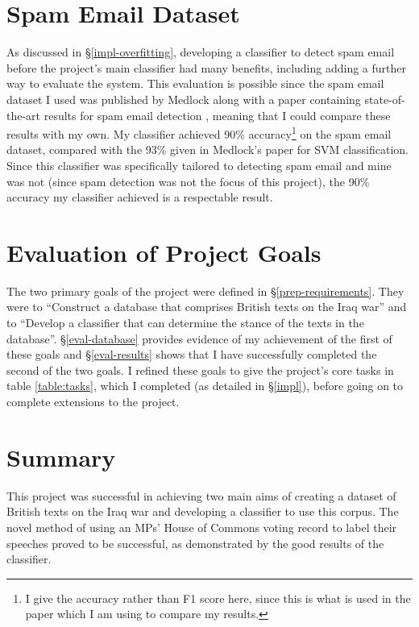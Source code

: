 \documentclass[12pt,a4paper,twoside,openright]{report}
\begin{document}
\section{Spam Email Dataset} \label{eval-spam}

As discussed in \S\ref{impl-overfitting}, developing a classifier to detect spam email before the project's main classifier had many benefits, including adding a further way to evaluate the system. This evaluation is possible since the spam email dataset I used was published by Medlock along with a paper containing state-of-the-art results for spam email detection \cite{spampaper}, meaning that I could compare these results with my own. My classifier achieved 90\% accuracy\footnote{I give the accuracy rather than F1 score here, since this is what is used in the paper which I am using to compare my results.} on the spam email dataset, compared with the 93\% given in Medlock's paper for SVM classification. Since this classifier was specifically tailored to detecting spam email and mine was not (since spam detection was not the focus of this project), the 90\% accuracy my classifier achieved is a respectable result.

\section{Evaluation of Project Goals} \label{eval-goals}

The two primary goals of the project were defined in \S\ref{prep-requirements}. They were to ``Construct a database that comprises British texts on the Iraq war'' and to ``Develop a classifier that can determine the stance of the texts in the database''. \S\ref{eval-database} provides evidence of my achievement of the first of these goals and \S\ref{eval-results} shows that I have successfully completed the second of the two goals. I refined these goals to give the project's core tasks in table \ref{table:tasks}, which I completed (as detailed in \S\ref{impl}), before going on to complete extensions to the project.

\section{Summary}

This project was successful in achieving two main aims of creating a dataset of British texts on the Iraq war and developing a classifier to use this corpus. The novel method of using an MPs' House of Commons voting record to label their speeches proved to be successful, as demonstrated by the good results of the classifier.
\end{document}
